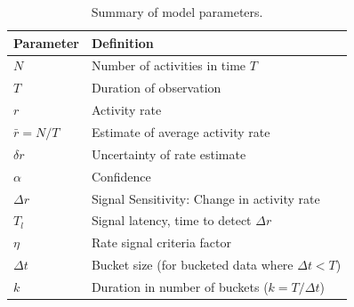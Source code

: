 \documentclass{article}
\begin{document}
\begin{table} [!h]
    \begin{tabular}{m{4cm}| m{7cm}}
     \hline
Parameter  & Definition \\
\hline	
$N$ & Number of activities in time $T$\\
$T$ & Duration of observation\\
$r$ & Activity rate \\
$\bar{r} = N/T$ & Estimate of average activity rate \\
$\delta r$ & Uncertainty of rate estimate \\
$\alpha$ & Confidence\\
$\Delta r$ & Signal Sensitivity: Change in activity rate \\
$T_l$ & Signal latency, time to detect $\Delta r$  \\
$\eta$ & Rate signal criteria factor \\
$\Delta t$ & Bucket size (for bucketed data where $\Delta t <T$) \\
$k$ & Duration in number of  buckets ($k=T/\Delta t$) \\
\hline
\end{tabular}
\caption{Summary of model parameters.}
\label{tab:summary}
\end{table}
\end{document}

